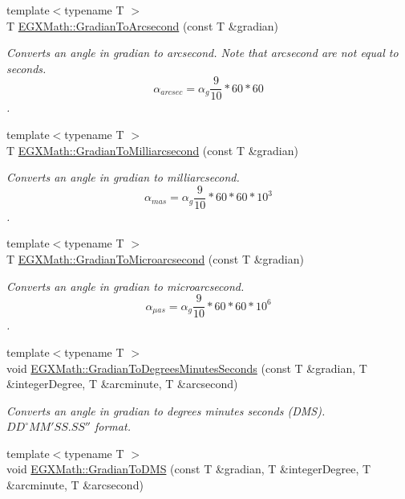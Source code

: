\begin{DoxyCompactItemize}
{\footnotesize template$<$typename T $>$ }\\T \mbox{\hyperlink{group___e_g_x_math-_angle_conversions-_gradian_gac768fd444195264165d332f2f5e84d92}{E\+G\+X\+Math\+::\+Gradian\+To\+Arcsecond}} (const T \&gradian)
\begin{DoxyCompactList}\small\item\em Converts an angle in gradian to arcsecond. Note that arcsecond are not equal to seconds. \[\alpha_{arcsec}=\alpha_{g}\frac{9}{10} * 60 * 60\]. \end{DoxyCompactList}\item 
{\footnotesize template$<$typename T $>$ }\\T \mbox{\hyperlink{group___e_g_x_math-_angle_conversions-_gradian_gad77ea0956413029f4166dce8d7f5ce83}{E\+G\+X\+Math\+::\+Gradian\+To\+Milliarcsecond}} (const T \&gradian)
\begin{DoxyCompactList}\small\item\em Converts an angle in gradian to milliarcsecond. \[\alpha_{mas}=\alpha_{g}\frac{9}{10} * 60 * 60 * 10^3\]. \end{DoxyCompactList}\item 
{\footnotesize template$<$typename T $>$ }\\T \mbox{\hyperlink{group___e_g_x_math-_angle_conversions-_gradian_gab7781c860ea3ab9c9cf76ab639846a07}{E\+G\+X\+Math\+::\+Gradian\+To\+Microarcsecond}} (const T \&gradian)
\begin{DoxyCompactList}\small\item\em Converts an angle in gradian to microarcsecond. \[\alpha_{\mu as}=\alpha_{g}\frac{9}{10} * 60 * 60 * 10^6\]. \end{DoxyCompactList}\item 
{\footnotesize template$<$typename T $>$ }\\void \mbox{\hyperlink{group___e_g_x_math-_angle_conversions-_gradian_ga5c81967ddb8f677634d161713174e419}{E\+G\+X\+Math\+::\+Gradian\+To\+Degrees\+Minutes\+Seconds}} (const T \&gradian, T \&integer\+Degree, T \&arcminute, T \&arcsecond)
\begin{DoxyCompactList}\small\item\em Converts an angle in gradian to degrees minutes seconds (D\+MS). ${DD}^{\circ}{MM}'{SS.SS}''$ format. \end{DoxyCompactList}\item 
{\footnotesize template$<$typename T $>$ }\\void \mbox{\hyperlink{group___e_g_x_math-_angle_conversions-_gradian_ga0b6700b55ab4a24fa581bf2af0dafdaa}{E\+G\+X\+Math\+::\+Gradian\+To\+D\+MS}} (const T \&gradian, T \&integer\+Degree, T \&arcminute, T \&arcsecond)

\end{DoxyCompactItemize}
